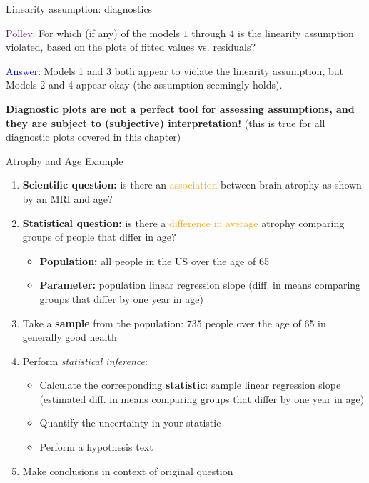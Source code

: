 \documentclass[10pt,t]{beamer}
\begin{document}
\begin{frame}{Linearity assumption: diagnostics}
	\vspace{-5 mm}

\textcolor{purple}{Pollev:} For which (if any) of the models $1$ through $4$ is the linearity assumption violated, based on the plots of fitted values vs. residuals?

\vspace{0.3cm}

\textcolor{blue}{Answer:} Models 1 and 3 both appear to violate the linearity assumption, but Models 2 and 4 appear okay (the assumption seemingly holds). 

\vspace{0.3cm}

\textbf{Diagnostic plots are not a perfect tool for assessing assumptions, and they are subject to (subjective) interpretation!} (this is true for all diagnostic plots covered in this chapter)
\end{frame}

\begin{frame}{Atrophy and Age Example}
	\begin{enumerate}
		\item \textbf{Scientific question:} is there an \textcolor{orange}{association} between brain atrophy as shown by an MRI and age?
		\item \textbf{Statistical question:} is there a \textcolor{orange}{difference in average} atrophy comparing groups of people that differ in age? 
		\begin{itemize}
			\item \textbf{Population:} all people in the US over the age of 65
			\item \textbf{Parameter:} population linear regression slope (diff. in means comparing groups that differ by one year in age) 
		\end{itemize}
		\item Take a \textbf{sample} from the population: 735 people over the age of 65 in generally good health 
		\item Perform \textit{statistical inference}:
		\begin{itemize}
			\item Calculate the corresponding \textbf{statistic}: sample linear regression slope (estimated diff. in means comparing groups that differ by one year in age)
			\item Quantify the uncertainty in your statistic
			\item Perform a hypothesis text
		\end{itemize}
		\item Make conclusions in context of original question
	\end{enumerate}
	
\end{frame}
\end{document}
